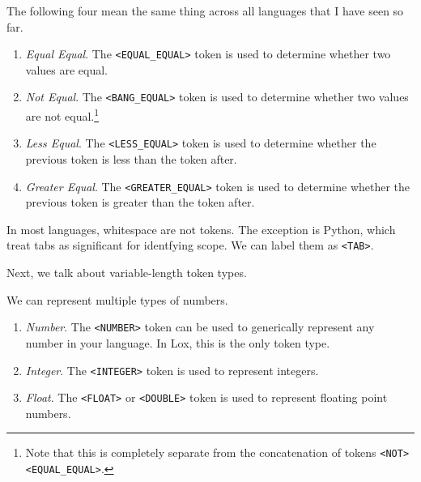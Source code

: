   \begin{example}
    The following four mean the same thing across all languages that I have seen so far. 
    \begin{enumerate}
      \item \textit{Equal Equal}. The \texttt{<EQUAL\_EQUAL>} token is used to determine whether two values are equal. 
      \item \textit{Not Equal}. The \texttt{<BANG\_EQUAL>} token is used to determine whether two values are not equal.\footnote{Note that this is completely separate from the concatenation of tokens \texttt{<NOT><EQUAL\_EQUAL>}.} 
      \item \textit{Less Equal}. The \texttt{<LESS\_EQUAL>} token is used to determine whether the previous token is less than the token after. 
      \item \textit{Greater Equal}. The \texttt{<GREATER\_EQUAL>} token is used to determine whether the previous token is greater than the token after. 
    \end{enumerate}
  \end{example}

  \begin{example}[Whitespace]
    In most languages, whitespace are not tokens. The exception is Python, which treat tabs as significant for identfying scope. We can label them as \texttt{<TAB>}.
  \end{example}

  Next, we talk about variable-length token types. 

  \begin{example}[Identifiers]
    
  \end{example}

  \begin{example}[String]
    
  \end{example}

  \begin{example}[Numbers]
    We can represent multiple types of numbers. 
    \begin{enumerate}
      \item \textit{Number}. The \texttt{<NUMBER>} token can be used to generically represent any number in your language. In Lox, this is the only token type. 
      \item \textit{Integer}. The \texttt{<INTEGER>} token is used to represent integers. 
      \item \textit{Float}. The \texttt{<FLOAT>} or \texttt{<DOUBLE>} token is used to represent floating point numbers. 
    \end{enumerate}
  \end{example}


